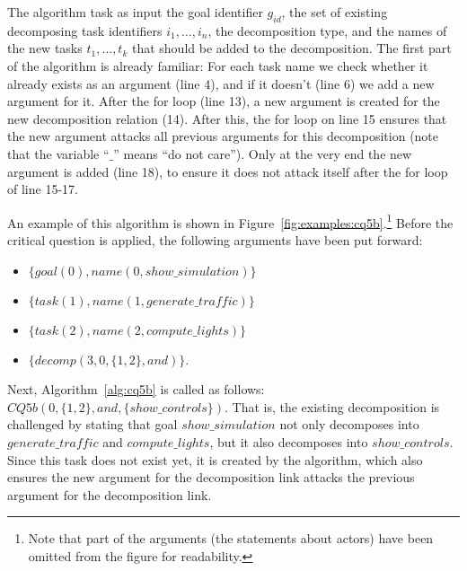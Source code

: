 The algorithm task as input the goal identifier $g_{id}$, the set of existing decomposing task identifiers $i_1,\ldots,i_n$, the decomposition type, and the names of the new tasks $t_1,\ldots,t_k$ that should be added to the decomposition. The first part  of the algorithm is already familiar: For each task name we check whether it already exists as an argument (line 4), and if it doesn't (line 6) we add a new argument for it. After the for loop (line 13), a new argument is created for the new decomposition relation (14). After this, the for loop on line 15 ensures that the new argument attacks all previous arguments for this decomposition (note that the variable ``$\_$'' means ``do not care''). Only at the very end the new argument is added (line 18), to ensure it does not attack itself after the for loop of line 15-17. 

An example of this algorithm is shown in Figure~\ref{fig:examples:cq5b}.\footnote{Note that part of the arguments (the statements about actors) have been omitted from the figure for readability.} Before the critical question is applied, the following arguments have been put forward:
\begin{itemize}
\item $\{goal(0),name(0,show\_simulation)\}$
\item $\{task(1),name(1,generate\_traffic)\}$
\item $\{task(2),name(2,compute\_lights)\}$
\item $\{decomp(3,0,\{1,2\},and)\}$.
\end{itemize}

Next, Algorithm~\ref{alg:cq5b} is called as follows: $CQ5b(0,\{1,2\},and,\{show\_controls\})$. That is, the existing decomposition is challenged by stating that goal $show\_simulation$ not only decomposes into $generate\_traffic$ and $compute\_lights$, but it also decomposes into $show\_controls$. Since this task does not exist yet, it is created by the algorithm, which also ensures the new argument for the decomposition link attacks the previous argument for the decomposition link.


